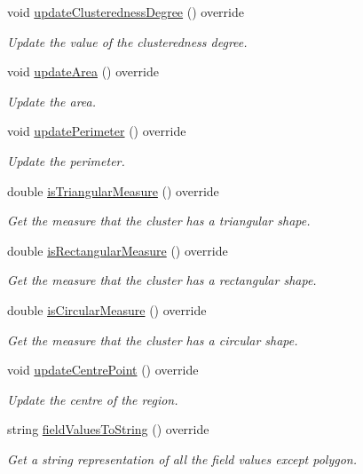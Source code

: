 \begin{DoxyCompactItemize}
void \hyperlink{classmultiscale_1_1analysis_1_1Region_a35c88944e2704571214b6e28dd657350}{update\-Clusteredness\-Degree} () override
\begin{DoxyCompactList}\small\item\em Update the value of the clusteredness degree. \end{DoxyCompactList}\item 
void \hyperlink{classmultiscale_1_1analysis_1_1Region_a88adaf10fae7c554581498f86f1863fa}{update\-Area} () override
\begin{DoxyCompactList}\small\item\em Update the area. \end{DoxyCompactList}\item 
void \hyperlink{classmultiscale_1_1analysis_1_1Region_a58a4a22cb77fc6963592ec156458f310}{update\-Perimeter} () override
\begin{DoxyCompactList}\small\item\em Update the perimeter. \end{DoxyCompactList}\item 
double \hyperlink{classmultiscale_1_1analysis_1_1Region_acb88d149b42eee5225e7197a225d31c3}{is\-Triangular\-Measure} () override
\begin{DoxyCompactList}\small\item\em Get the measure that the cluster has a triangular shape. \end{DoxyCompactList}\item 
double \hyperlink{classmultiscale_1_1analysis_1_1Region_a2310c3e3c6f1dea310e14e46d466a204}{is\-Rectangular\-Measure} () override
\begin{DoxyCompactList}\small\item\em Get the measure that the cluster has a rectangular shape. \end{DoxyCompactList}\item 
double \hyperlink{classmultiscale_1_1analysis_1_1Region_aa59dcbe337f4db849d66cb3902617ccd}{is\-Circular\-Measure} () override
\begin{DoxyCompactList}\small\item\em Get the measure that the cluster has a circular shape. \end{DoxyCompactList}\item 
void \hyperlink{classmultiscale_1_1analysis_1_1Region_a3753b8789a73c1e3b5d189aa710aec86}{update\-Centre\-Point} () override
\begin{DoxyCompactList}\small\item\em Update the centre of the region. \end{DoxyCompactList}\item 
string \hyperlink{classmultiscale_1_1analysis_1_1Region_a4fa8cfecf2fc3708c66022655a055dc6}{field\-Values\-To\-String} () override
\begin{DoxyCompactList}\small\item\em Get a string representation of all the field values except polygon. \end{DoxyCompactList}\end{DoxyCompactItemize}
